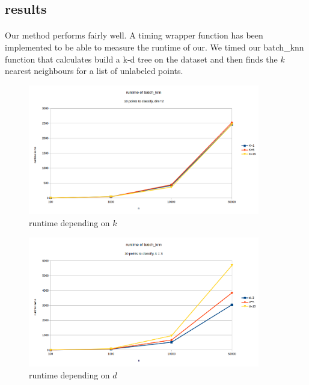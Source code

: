 \documentclass[11 pt]{article}
\begin{document}
\subsection{results}
\paragraph{}Our method performs fairly well. A timing wrapper function has been implemented to be able to measure the runtime of our. We timed our batch\_knn function that calculates build a k-d tree on the dataset and then finds the $k$ nearest neighbours for a list of unlabeled points.
\begin{center}

\begin{figure}[H]
  \includegraphics[width=0.9\textwidth]{figures/runK.png}
  \caption{runtime depending on $k$}
  \label{runK}
\end{figure}
\begin{figure}[H]
  \includegraphics[width=0.9\textwidth]{figures/runDim.png}
  \caption{runtime depending on $d$}
  \label{runD}
\end{figure}
\end{center}
\end{document}
